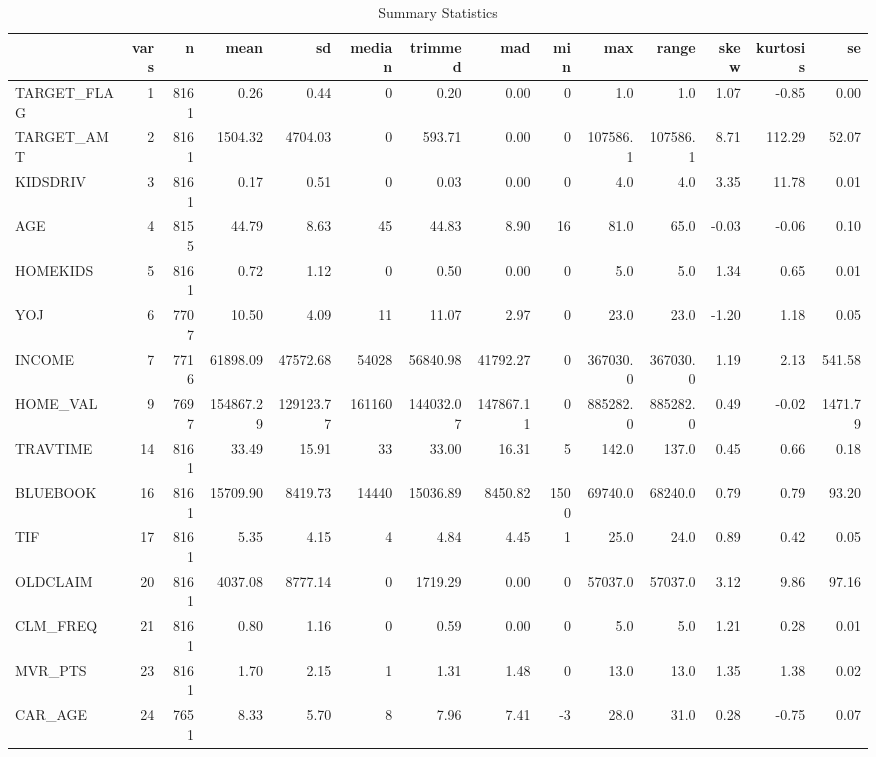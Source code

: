 \documentclass[
]{article}
\begin{document}
\begin{landscape}\begin{table}[H]
\centering\centering
\caption{\label{tab:summary}Summary Statistics}
\centering
\begin{tabular}[t]{l|r|r|r|r|r|r|r|r|r|r|r|r|r}
\hline
  & vars & n & mean & sd & median & trimmed & mad & min & max & range & skew & kurtosis & se\\
\hline
TARGET\_FLAG & 1 & 8161 & 0.26 & 0.44 & 0 & 0.20 & 0.00 & 0 & 1.0 & 1.0 & 1.07 & -0.85 & 0.00\\
\hline
TARGET\_AMT & 2 & 8161 & 1504.32 & 4704.03 & 0 & 593.71 & 0.00 & 0 & 107586.1 & 107586.1 & 8.71 & 112.29 & 52.07\\
\hline
KIDSDRIV & 3 & 8161 & 0.17 & 0.51 & 0 & 0.03 & 0.00 & 0 & 4.0 & 4.0 & 3.35 & 11.78 & 0.01\\
\hline
AGE & 4 & 8155 & 44.79 & 8.63 & 45 & 44.83 & 8.90 & 16 & 81.0 & 65.0 & -0.03 & -0.06 & 0.10\\
\hline
HOMEKIDS & 5 & 8161 & 0.72 & 1.12 & 0 & 0.50 & 0.00 & 0 & 5.0 & 5.0 & 1.34 & 0.65 & 0.01\\
\hline
YOJ & 6 & 7707 & 10.50 & 4.09 & 11 & 11.07 & 2.97 & 0 & 23.0 & 23.0 & -1.20 & 1.18 & 0.05\\
\hline
INCOME & 7 & 7716 & 61898.09 & 47572.68 & 54028 & 56840.98 & 41792.27 & 0 & 367030.0 & 367030.0 & 1.19 & 2.13 & 541.58\\
\hline
HOME\_VAL & 9 & 7697 & 154867.29 & 129123.77 & 161160 & 144032.07 & 147867.11 & 0 & 885282.0 & 885282.0 & 0.49 & -0.02 & 1471.79\\
\hline
TRAVTIME & 14 & 8161 & 33.49 & 15.91 & 33 & 33.00 & 16.31 & 5 & 142.0 & 137.0 & 0.45 & 0.66 & 0.18\\
\hline
BLUEBOOK & 16 & 8161 & 15709.90 & 8419.73 & 14440 & 15036.89 & 8450.82 & 1500 & 69740.0 & 68240.0 & 0.79 & 0.79 & 93.20\\
\hline
TIF & 17 & 8161 & 5.35 & 4.15 & 4 & 4.84 & 4.45 & 1 & 25.0 & 24.0 & 0.89 & 0.42 & 0.05\\
\hline
OLDCLAIM & 20 & 8161 & 4037.08 & 8777.14 & 0 & 1719.29 & 0.00 & 0 & 57037.0 & 57037.0 & 3.12 & 9.86 & 97.16\\
\hline
CLM\_FREQ & 21 & 8161 & 0.80 & 1.16 & 0 & 0.59 & 0.00 & 0 & 5.0 & 5.0 & 1.21 & 0.28 & 0.01\\
\hline
MVR\_PTS & 23 & 8161 & 1.70 & 2.15 & 1 & 1.31 & 1.48 & 0 & 13.0 & 13.0 & 1.35 & 1.38 & 0.02\\
\hline
CAR\_AGE & 24 & 7651 & 8.33 & 5.70 & 8 & 7.96 & 7.41 & -3 & 28.0 & 31.0 & 0.28 & -0.75 & 0.07\\
\hline
\end{tabular}
\end{table}
\end{landscape}
\end{document}
